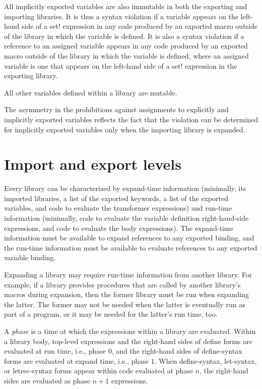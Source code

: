 All implicitly exported variables are also immutable in both the
exporting and importing libraries.
It is thus a syntax violation if a
variable appears on the left-hand side of a {\cf set!}
expression in any code produced by an exported macro outside of the
library in which the variable is defined.
It is also a syntax violation if a
reference to an assigned variable appears in any code produced by
an exported macro outside of the library in which the variable is defined,
where an assigned variable is one that appears on the left-hand
side of a {\cf set!} expression in the exporting library.

All other variables defined within a library are mutable.

\begin{rationale}
The asymmetry in the prohibitions against assignments to
explicitly and implicitly exported variables reflects the fact that the
violation can be determined for implicitly exported variables only when the
importing library is expanded.
\end{rationale}

\section{Import and export levels}
\label{phasessection}

Every library can be characterized by expand-time information (minimally,
its imported libraries, a list of the exported keywords, a list of the
exported variables, and code to evaluate the transformer expressions) and
run-time information (minimally, code to evaluate the variable definition
right-hand-side expressions, and code to evaluate the body expressions).
The expand-time information must be available to expand references to
any exported binding, and the run-time information must be available to
evaluate references to any exported variable binding.

Expanding a library may require run-time information from another
library. For example, if a library provides procedures that are called
by another library's macros during expansion, then the former library
must be run when expanding the latter. The former may not be needed
when the latter is eventually run as part of a program, or it may be
needed for the latter's run time, too.

%
A \emph{phase} is a time at which the expressions within a library are
evaluated.
Within a library body, top-level expressions and
the right-hand sides of {\cf define} forms are evaluated at run time,
i.e., phase $0$, and the right-hand
sides of {\cf define-syntax} forms are evaluated at expand time, i.e.,
phase $1$.
When {\cf define-syntax},
{\cf let-syntax}, or {\cf letrec-syntax}
forms appear within code evaluated at phase $n$, the right-hand sides
are evaluated as phase $n+1$ expressions.


